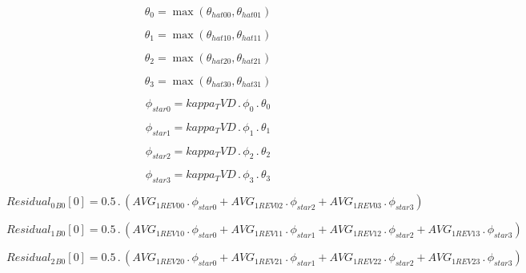\documentclass{article}
\begin{document}
\begin{dmath}\theta_{0} = \max\left(\theta_{hat 00}, \theta_{hat 01}\right)\end{dmath}

\begin{dmath}\theta_{1} = \max\left(\theta_{hat 10}, \theta_{hat 11}\right)\end{dmath}

\begin{dmath}\theta_{2} = \max\left(\theta_{hat 20}, \theta_{hat 21}\right)\end{dmath}

\begin{dmath}\theta_{3} = \max\left(\theta_{hat 30}, \theta_{hat 31}\right)\end{dmath}

\begin{dmath}\phi_{star 0} = kappa_TVD \,.\, \phi_{0} \,.\, \theta_{0}\end{dmath}

\begin{dmath}\phi_{star 1} = kappa_TVD \,.\, \phi_{1} \,.\, \theta_{1}\end{dmath}

\begin{dmath}\phi_{star 2} = kappa_TVD \,.\, \phi_{2} \,.\, \theta_{2}\end{dmath}

\begin{dmath}\phi_{star 3} = kappa_TVD \,.\, \phi_{3} \,.\, \theta_{3}\end{dmath}

\begin{dmath}{Residual_{0}{_{B0}}}[{0}] = 0.5 \,.\, \left(AVG_{1 REV 00} \,.\, \phi_{star 0} + AVG_{1 REV 02} \,.\, \phi_{star 2} + AVG_{1 REV 03} \,.\, \phi_{star 3}\right)\end{dmath}

\begin{dmath}{Residual_{1}{_{B0}}}[{0}] = 0.5 \,.\, \left(AVG_{1 REV 10} \,.\, \phi_{star 0} + AVG_{1 REV 11} \,.\, \phi_{star 1} + AVG_{1 REV 12} \,.\, \phi_{star 2} + AVG_{1 REV 13} \,.\, \phi_{star 3}\right)\end{dmath}

\begin{dmath}{Residual_{2}{_{B0}}}[{0}] = 0.5 \,.\, \left(AVG_{1 REV 20} \,.\, \phi_{star 0} + AVG_{1 REV 21} \,.\, \phi_{star 1} + AVG_{1 REV 22} \,.\, \phi_{star 2} + AVG_{1 REV 23} \,.\, \phi_{star 3}\right)\end{dmath}
\end{document}
